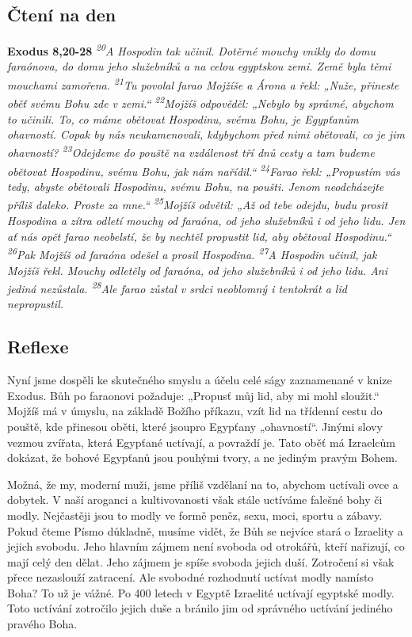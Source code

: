 \documentclass[11pt]{article}
\begin{document}
\subsection*{Čtení na den}
\textbf{Exodus 8,20-28}
\newline
\textit{
\textsuperscript{20}A Hospodin tak učinil. Dotěrné mouchy vnikly do domu faraónova, do domu jeho služebníků a na celou egyptskou zemi. Země byla těmi mouchami zamořena.
\textsuperscript{21}Tu povolal farao Mojžíše a Árona a řekl: „Nuže, přineste oběť svému Bohu zde v zemi.“
\textsuperscript{22}Mojžíš odpověděl: „Nebylo by správné, abychom to učinili. To, co máme obětovat Hospodinu, svému Bohu, je Egypťanům ohavností. Copak by nás neukamenovali, kdybychom před nimi obětovali, co je jim ohavností?
\textsuperscript{23}Odejdeme do pouště na vzdálenost tří dnů cesty a tam budeme obětovat Hospodinu, svému Bohu, jak nám nařídil.“
\textsuperscript{24}Farao řekl: „Propustím vás tedy, abyste obětovali Hospodinu, svému Bohu, na poušti. Jenom neodcházejte příliš daleko. Proste za mne.“
\textsuperscript{25}Mojžíš odvětil: „Až od tebe odejdu, budu prosit Hospodina a zítra odletí mouchy od faraóna, od jeho služebníků i od jeho lidu. Jen ať nás opět farao neobelstí, že by nechtěl propustit lid, aby obětoval Hospodinu.“
\textsuperscript{26}Pak Mojžíš od faraóna odešel a prosil Hospodina.
\textsuperscript{27}A Hospodin učinil, jak Mojžíš řekl. Mouchy odletěly od faraóna, od jeho služebníků i od jeho lidu. Ani jediná nezůstala.
\textsuperscript{28}Ale farao zůstal v srdci neoblomný i tentokrát a lid nepropustil.
  }

\subsection*{Reflexe}
Nyní jsme dospěli ke skutečného smyslu a účelu celé ságy zaznamenané v knize Exodus. Bůh po
faraonovi požaduje: „Propusť můj lid, aby mi mohl sloužit.“ Mojžíš má v úmyslu, na základě Božího
příkazu, vzít lid na třídenní cestu do pouště, kde přinesou oběti, které jsoupro Egypťany „ohavností“.
Jinými slovy vezmou zvířata, která Egypťané uctívají, a povraždí je. Tato oběť má Izraelcům dokázat, že
bohové Egypťanů jsou pouhými tvory, a ne jediným pravým Bohem.

Možná, že my, moderní muži, jsme příliš vzdělaní na to, abychom uctívali ovce a dobytek. V naší
aroganci a kultivovanosti však stále uctíváme falešné bohy či modly. Nejčastěji jsou to modly ve formě
peněz, sexu, moci, sportu a zábavy. Pokud čteme Písmo důkladně, musíme vidět, že Bůh se nejvíce stará
o Izraelity a jejich svobodu. Jeho hlavním zájmem není svoboda od otrokářů, kteří nařizují, co mají celý
den dělat. Jeho zájmem je spíše svoboda jejich duší. Zotročení si však přece nezaslouží zatracení. Ale
svobodné rozhodnutí uctívat modly namísto Boha? To už je vážné. Po 400 letech v Egyptě Izraelité
uctívají egyptské modly. Toto uctívání zotročilo jejich duše a bránilo jim od správného uctívání jediného
pravého Boha.
\end{document}
